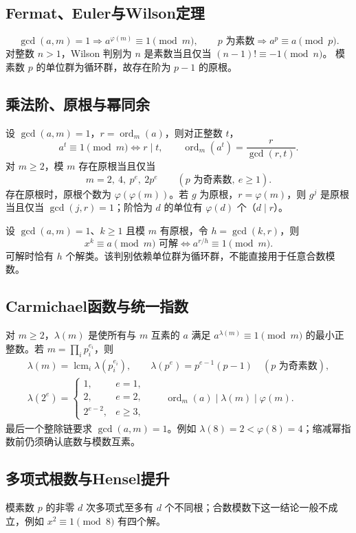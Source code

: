 \documentclass[../main.tex]{subfiles}
\begin{document}
\subsection{Fermat、Euler与Wilson定理}
\[
\gcd(a,m)=1\Longrightarrow a^{\varphi(m)}\equiv1\pmod m,
\qquad p\text{ 为素数}\Longrightarrow a^p\equiv a\pmod p.
\]
对整数 $n>1$，Wilson 判别为 $n$ 是素数当且仅当 $(n-1)!\equiv-1\pmod n$。
模素数 $p$ 的单位群为循环群，故存在阶为 $p-1$ 的原根。
\subsection{乘法阶、原根与幂同余}
设 $\gcd(a,m)=1$，$r=\operatorname{ord}_m(a)$，则对正整数 $t$，
\[
a^t\equiv1\pmod m\iff r\mid t,\qquad
\operatorname{ord}_m(a^t)=\frac r{\gcd(r,t)}.
\]
对 $m\ge2$，模 $m$ 存在原根当且仅当
\[
m=2,\ 4,\ p^e,\ 2p^e\qquad(p\text{ 为奇素数},\ e\ge1).
\]
存在原根时，原根个数为 $\varphi(\varphi(m))$。若 $g$ 为原根，$r=\varphi(m)$，则 $g^j$ 是原根当且仅当 $\gcd(j,r)=1$；阶恰为 $d$ 的单位有 $\varphi(d)$ 个（$d\mid r$）。

设 $\gcd(a,m)=1$、$k\ge1$ 且模 $m$ 有原根，令 $h=\gcd(k,r)$，则
\[
x^k\equiv a\pmod m\text{ 可解}\iff a^{r/h}\equiv1\pmod m.
\]
可解时恰有 $h$ 个解类。该判别依赖单位群为循环群，不能直接用于任意合数模数。

\subsection{Carmichael函数与统一指数}
对 $m\ge2$，$\lambda(m)$ 是使所有与 $m$ 互素的 $a$ 满足 $a^{\lambda(m)}\equiv1\pmod m$ 的最小正整数。若 $m=\prod_i p_i^{e_i}$，则
\begin{gather*}
\lambda(m)=\operatorname{lcm}_i\lambda(p_i^{e_i}),\qquad
\lambda(p^e)=p^{e-1}(p-1)\quad(p\text{ 为奇素数}),\\
\lambda(2^e)=\begin{cases}
1,&e=1,\\2,&e=2,\\2^{e-2},&e\ge3,
\end{cases}\qquad
\operatorname{ord}_m(a)\mid\lambda(m)\mid\varphi(m).
\end{gather*}
最后一个整除链要求 $\gcd(a,m)=1$。例如 $\lambda(8)=2<\varphi(8)=4$；缩减幂指数前仍须确认底数与模数互素。

\subsection{多项式根数与Hensel提升}
模素数 $p$ 的非零 $d$ 次多项式至多有 $d$ 个不同根；合数模数下这一结论一般不成立，例如 $x^2\equiv1\pmod8$ 有四个解。
\end{document}
